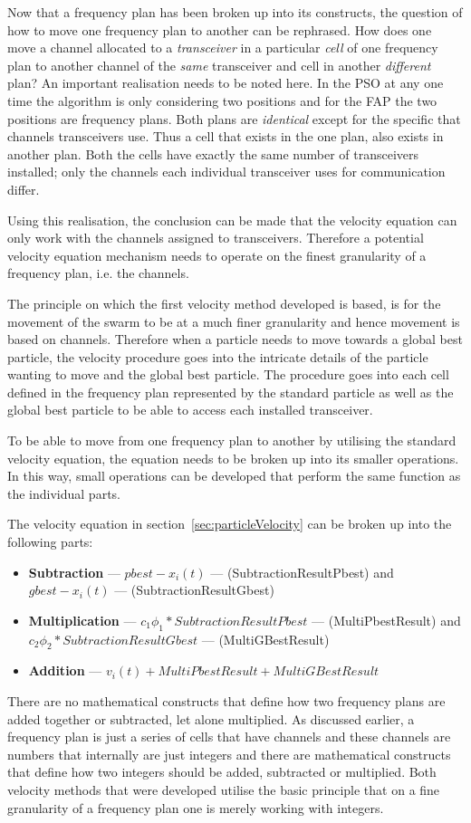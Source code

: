 Now that a frequency plan has been broken up into its constructs, the question of how to move one frequency plan to another can be rephrased. How does one move a channel allocated to a \emph{transceiver} in a particular \emph{cell} of one frequency plan to another channel of the \emph{same} transceiver and cell in another \emph{different} plan? An important realisation needs to be noted here. In the PSO at any one time the algorithm is only considering two positions and for the FAP the two positions are frequency plans. Both plans are \emph{identical} except for the specific that channels transceivers use. Thus a cell that exists in the one plan, also exists in another plan. Both the cells have exactly the same number of transceivers installed; only the channels each individual transceiver uses for communication differ.

Using this realisation, the conclusion can be made that the velocity equation can only work with the channels assigned to transceivers. Therefore a potential velocity equation mechanism needs to operate on the finest granularity of a frequency plan, i.e. the channels.

The principle on which the first velocity method developed is based, is for the movement of the swarm to be at a much finer granularity and hence movement is based on channels. Therefore when a particle needs to move towards a global best particle, the velocity procedure goes into the intricate details of the particle wanting to move and the global best particle. The procedure goes into each cell defined in the frequency plan represented by the standard particle as well as the global best particle to be able to access each installed transceiver.

To be able to move from one frequency plan to another by utilising the standard velocity equation, the equation needs to be broken up into its smaller operations. In this way, small operations can be developed that perform the same function as the individual parts. 

The velocity equation in section~\ref{sec:particleVelocity} can be broken up into the following parts:
\label{lst:velocitybreakup}
\begin{itemize}
\item \textbf{Subtraction} --- $pbest - x_i(t)$ --- (SubtractionResultPbest) and $gbest - x_i(t)$ --- (SubtractionResultGbest)
\item \textbf{Multiplication} --- $c_1\phi_1 * SubtractionResultPbest$ --- (MultiPbestResult) and $c_2\phi_2 * SubtractionResultGbest$ --- (MultiGBestResult)
\item \textbf{Addition} --- $v_i(t) + MultiPbestResult + MultiGBestResult$
\end{itemize}
There are no mathematical constructs that define how two frequency plans are added together or subtracted, let alone multiplied. As discussed earlier, a frequency plan is just a series of cells that have channels and these channels are numbers that internally are just integers and there are mathematical constructs that define how two integers should be added, subtracted or multiplied. Both velocity methods that were developed utilise the basic principle that on a fine granularity of a frequency plan one is merely working with integers.

